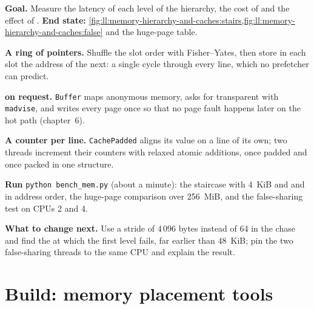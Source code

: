 \begin{tutorial}
\textbf{Goal.} Measure the latency of each level of the hierarchy, the cost of  and the effect of . \textbf{End state:} \cref{fig:ll:memory-hierarchy-and-caches:stairs,fig:ll:memory-hierarchy-and-caches:false} and
the huge-page table.
\begin{tutsteps}
\item \textbf{A ring of pointers.} Shuffle the slot order with Fisher--Yates, then store in each slot the address of the
next: a single cycle through every line, which no prefetcher can predict.
\label{lst:ll:memory-hierarchy-and-caches:chase}
\item \textbf{ on request.} \texttt{Buffer} maps anonymous memory, asks for transparent  with
\texttt{madvise}, and writes every page once so that no page fault happens later on the hot path (chapter~6).
\label{lst:ll:memory-hierarchy-and-caches:buffer}
\item \textbf{A counter per line.} \texttt{CachePadded} aligns its value on a line of its own; two threads increment
their counters with relaxed atomic additions, once padded and once packed in one structure.
\label{lst:ll:memory-hierarchy-and-caches:padded}
\item \textbf{Run} \texttt{python bench\_mem.py} (about a minute): the staircase with 4~KiB and  and in address
order, the huge-page comparison over 256~MiB, and the false-sharing test on CPUs 2 and 4.
\end{tutsteps}
\textbf{What to change next.} Use a stride of 4\,096 bytes instead of 64 in the chase and find the  at which
the first level fails, far earlier than 48~KiB; pin the two false-sharing threads to the same CPU and explain the result.
\end{tutorial}

\section{Build: memory placement tools}\label{bld:ll:memory-hierarchy-and-caches:memkit}

